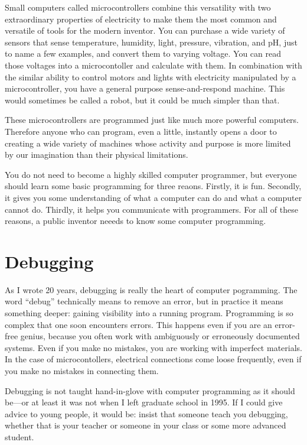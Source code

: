 \documentclass[
	fontsize=10pt, %
	twoside=false, %
	secnumdepth=1, %
]{kaobook}
\begin{document}
Small computers called microcontrollers combine this
versatility with two extraordinary properties of electricity
to make them the most common and versatile of tools for the modern inventor.
You can purchase a wide variety of sensors that sense
temperature, humidity, light, pressure, vibration, and pH, just
to name a few examples, and convert them to varying voltage.
You can read those voltages into a microcontoller and calculate with them.
In combination with the similar ability to control motors and lights with
electricity manipulated by a microcontroller, you have a general
purpose sense-and-respond machine. This would sometimes be called a
robot, but it could be much simpler than that.

These microcontrollers are programmed just like much more powerful
computers. Therefore anyone who can program, even a little,
instantly opens a door to creating a wide variety of machines whose
activity and purpose is more limited by our imagination than their
physical limitations.

You do not need to
become a highly skilled computer programmer, but
everyone should learn some basic programming for three reaons.
Firstly, it is fun.
Secondly, it gives you some understanding of what a computer
can do and what a computer cannot do.
Thirdly, it helps you communicate with programmers.
For all of these reasons, a public inventor neeeds to know
some computer programming.

\section{Debugging}

As I wrote 20 years\cite{HowToBeAProgrammer}, debugging
is really the heart of computer pogramming.
The word ``debug'' technically means to remove an error,
but in practice it means something deeper: gaining visibility
into a running program. Programming is so complex that one soon
encounters errors. This happens even if you are an error-free genius,
because you often work with ambiguously or erroneously documented systems.
Even if you make no mistakes, you are working with imperfect materials.
In the case of microcontollers, electrical connections come loose
frequently, even if you make no mistakes in connecting them.

Debugging is not taught hand-in-glove with computer programming
as it should be---or at least it was not when I left graduate school in 1995.
If I could give advice to young people, it would be: insist that someone
teach you debugging, whether that is your teacher or someone in your class
or some more advanced student.
\end{document}
